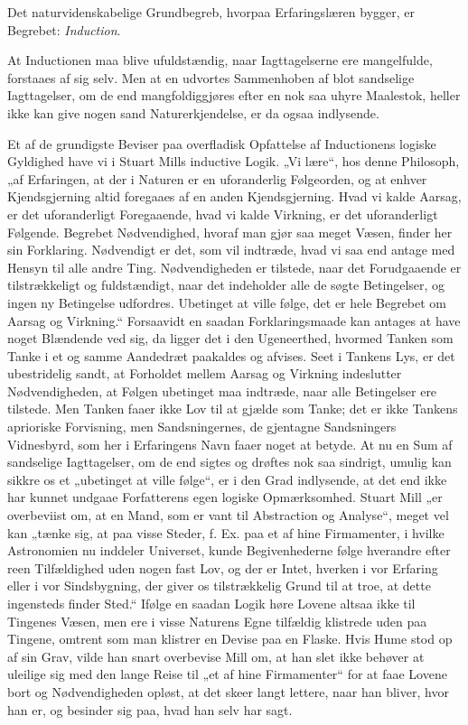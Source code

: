 \documentclass[12pt,a4paper]{book}
\begin{document}
Det naturvidenskabelige Grundbegreb, hvorpaa Erfaringslæren
bygger, er Begrebet: \emph{Induction}.

At Inductionen maa blive ufuldstændig, naar Iagttagelserne
ere mangelfulde, forstaaes af sig selv. Men at en udvortes
Sammenhoben af blot sandselige Iagttagelser, om de end
mangfoldiggjøres efter en nok saa uhyre Maalestok, heller ikke
kan give nogen sand Naturerkjendelse, er da ogsaa indlysende.

Et af de grundigste Beviser paa overfladisk Opfattelse af
Inductionens logiske Gyldighed have vi i Stuart Mills inductive
Logik. „Vi lære“, hos denne Philosoph, „af Erfaringen, at der
i Naturen er en uforanderlig Følgeorden, og at enhver
Kjendsgjerning altid foregaaes af en anden Kjendsgjerning. Hvad vi
kalde Aarsag, er det uforanderligt Foregaaende, hvad vi kalde
Virkning, er det uforanderligt Følgende. Begrebet
Nødvendighed, hvoraf man gjør saa meget Væsen, finder her sin
Forklaring. Nødvendigt er det, som vil indtræde, hvad vi saa end
antage med Hensyn til alle
andre Ting. Nødvendigheden er tilstede, naar det Forudgaaende
er tilstrækkeligt og fuldstændigt, naar det indeholder alle de
søgte Betingelser, og ingen ny Betingelse udfordres. Ubetinget
at ville følge, det er hele Begrebet om Aarsag og Virkning.“
Forsaavidt en saadan Forklaringsmaade kan antages at have
noget Blændende ved sig, da ligger det i den Ugeneerthed,
hvormed Tanken som Tanke i et og samme Aandedræt paakaldes
og afvises. Seet i Tankens Lys, er det ubestridelig sandt, at
Forholdet mellem Aarsag og Virkning indeslutter Nødvendigheden,
at Følgen ubetinget maa indtræde, naar alle Betingelser ere
tilstede. Men Tanken faaer ikke Lov til at gjælde som Tanke;
det er ikke Tankens aprioriske Forvisning, men Sandsningernes,
de gjentagne Sandsningers Vidnesbyrd, som her i Erfaringens
Navn faaer noget at betyde. At nu en Sum af sandselige
Iagttagelser, om de end sigtes og drøftes nok saa sindrigt, umulig
kan sikkre os et „ubetinget at ville følge“, er i den Grad
indlysende, at det end ikke har kunnet undgaae Forfatterens egen
logiske Opmærksomhed. Stuart Mill „er overbeviist om, at en
Mand, som er vant til Abstraction og Analyse“, meget vel kan
„tænke sig, at paa visse Steder, f. Ex. paa et af hine
Firmamenter, i hvilke Astronomien nu inddeler Universet, kunde
Begivenhederne følge hverandre efter reen Tilfældighed uden
nogen fast Lov, og der er Intet, hverken i vor Erfaring eller i
vor Sindsbygning, der giver os tilstrækkelig Grund til at troe,
at dette ingensteds finder Sted.“ Ifølge en saadan Logik høre
Lovene altsaa ikke til Tingenes Væsen, men ere i visse Naturens
Egne tilfældig klistrede uden paa Tingene, omtrent som man
klistrer en Devise paa en Flaske. Hvis Hume stod op af sin
Grav, vilde han snart overbevise Mill om, at han slet ikke
behøver at uleilige sig med den lange Reise til „et af hine
Firmamenter“ for at faae Lovene bort og Nødvendigheden opløst,
at det skeer langt lettere, naar han bliver, hvor han er, og
besinder sig paa, hvad han selv har sagt.
\end{document}
